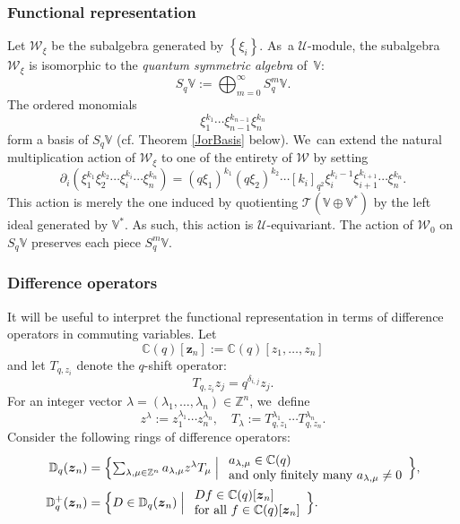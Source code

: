 \documentclass[11pt]{article}
\newcommand{\cf}{cf.\xspace}
\theoremstyle{definition}
\newcommand{\ZZ}{\mathbb{Z}}
\newcommand{\CC}{\mathbb{C}}
\newcommand{\UU}{\mathcal{U}}
\newcommand{\WW}{\mathcal{W}}
\newcommand{\del}{\partial}
\begin{document}
\subsubsection{Functional representation}
Let $\WW_{\xi}$ be the subalgebra generated by $\left\{ \xi_i \right\}$.
As~a $\UU$-module, the subalgebra $\WW_{\xi}$ is isomorphic to the \textit{quantum symmetric algebra} of~$\mathbb{V}$:
\[
S_q\mathbb{V}:=\bigoplus_{m=0}^\infty S_q^m\mathbb{V}.
\]
The ordered monomials
\[
\xi_1^{k_1}\cdots \xi_{n-1}^{k_{n-1}}\xi_n^{k_n}
\]
form a basis of $S_q\mathbb{V}$ (\cf Theorem \ref{JorBasis} below). We~can extend the natural multiplication action of $\WW_\xi$ to one of the entirety of $\WW$ by setting
\begin{equation*}
\del_i(\xi_1^{k_1}\xi_{2}^{k_{2}}\cdots \xi_{i}^{k_i}\cdots \xi_n^{k_n})=(q\xi_{1})^{k_{1}}(q\xi_{2})^{k_{2}}\cdots [k_i]_{q^2}\xi_i^{k_{i}-1}\xi_{i+1}^{k_{i+1}}\cdots \xi_n^{k_n}.
\end{equation*}
This action is merely the one induced by quotienting $\mathcal{T}(\mathbb{V}\oplus\mathbb{V}^*)$ by the left ideal generated by $\mathbb{V}^*$.
As such, this action is $\UU$-equivariant.
The action of $\WW_0$ on $S_q\mathbb{V}$ preserves each piece $S_q^m\mathbb{V}$.

\subsubsection{Difference operators}\label{WeylDiff}
It will be useful to interpret the functional representation in terms of difference operators in commuting variables.
Let
\[
\CC(q)[\boldsymbol{z}_n]:=\CC(q)[z_1,\ldots, z_n]
\]
and let $T_{q,z_i}$ denote the $q$-shift operator:
\[
T_{q,z_i}z_j=q^{\delta_{i,j}}z_j.
\]
For an integer vector $\lambda=(\lambda_1,\ldots,\lambda_n)\in\ZZ^n$, we~define
\[
z^\lambda:=z_1^{\lambda_1}\cdots z_n^{\lambda_n},\quad
T_\lambda:=T_{q,z_1}^{\lambda_1}\cdots T_{q,z_n}^{\lambda_n}.
\]
Consider the following rings of difference operators:
\begin{align*}
\mathbb{D}_q(\boldsymbol{z}_n)&= \Bigl\{ \textstyle\sum_{\lambda,\mu\in\ZZ^n}a_{\lambda,\mu}z^\lambda T_\mu\Bigm|
\begin{array}{l}
a_{\lambda,\mu}\in \CC(q) \\
\hbox{and only finitely many }a_{\lambda,\mu}\not=0
\end{array}
\Bigr\},\\
\mathbb{D}_q^+(\boldsymbol{z}_n)&= \Bigl\{ D\in \mathbb{D}_q(\boldsymbol{z}_n)\Bigm|
\begin{array}{l}
Df\in\CC(q)[\boldsymbol{z}_n]\\
\hbox{for all }f\in\CC(q)[\boldsymbol{z}_n]
\end{array}
\Bigr\}.
\end{align*}
\end{document}
